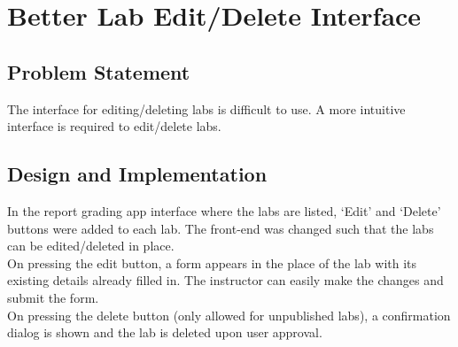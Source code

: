 \section{Better Lab Edit/Delete Interface}
\subsection{Problem Statement}
The interface for editing/deleting labs is difficult to use. A more intuitive interface is required to edit/delete labs.

\subsection{Design and Implementation}
In the report grading app interface where the labs are listed, `Edit' and `Delete' buttons were added to each lab. The front-end was changed such that the labs can be edited/deleted in place.\\
On pressing the edit button, a form appears in the place of the lab with its existing details already filled in. The instructor can easily make the changes and submit the form.\\
On pressing the delete button (only allowed for unpublished labs), a confirmation dialog is shown and the lab is deleted upon user approval.